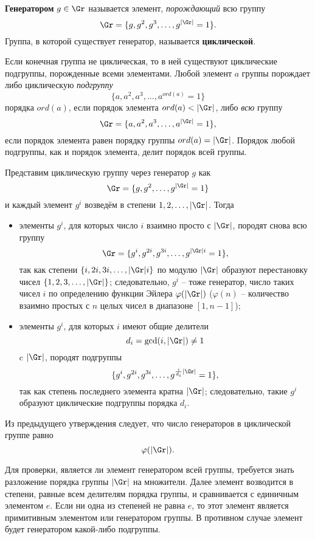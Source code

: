 \textbf{Генератором} $g \in \Gr$ называется элемент, \emph{порождающий} всю группу
    \[ \Gr = \{g, g^2, g^3,  \ldots,  g^{|\Gr|} = 1\}. \]
Группа, в которой существует генератор, называется \textbf{циклической}.

Если конечная группа не циклическая, то в ней существуют циклические подгруппы, порожденные всеми элементами. Любой элемент $a$ группы порождает либо циклическую \emph{подгруппу}
    \[ \{ a, a^2, a^3,  \dots,  a^{ord(a)} = 1 \} \]
порядка $ord(a)$, если порядок элемента $ord(a) < |\Gr|$, либо \emph{всю} группу
    \[ \Gr = \{ a, a^2, a^3,  \dots,  a^{|\Gr|} = 1 \}, \]
если порядок элемента равен порядку группы $ord(a) = |\Gr|$. Порядок любой подгруппы, как и порядок элемента, делит порядок всей группы.

Представим циклическую группу через генератор $g$ как
    \[ \Gr = \{g, g^2,  \ldots,  g^{|\Gr|} = 1\} \]
и каждый элемент $g^i$  возведём в степени $1, 2,  \ldots,  |\Gr|$. Тогда
\begin{itemize}
    \item элементы $g^i$, для которых число $i$ взаимно просто с $|\Gr|$, породят снова всю группу
            \[ \Gr = \{ g^i, g^{2i}, g^{3i},  \dots,  g^{|\Gr| i} = 1 \}, \]
        так как степени $\{i, 2i, 3i, \dots, |\Gr| i \}$ по модулю $|\Gr|$ образуют перестановку чисел $\{1, 2, 3, \dots, |\Gr|\}$; следовательно, $g^i$ -- тоже генератор, число таких чисел $i$ по определению функции Эйлера $\varphi(|\Gr|)$ ($\varphi(n)$ -- количество взаимно простых с $n$ целых чисел в диапазоне $[1,n-1]$);
    \item элементы $g^i$, для которых $i$ имеют общие делители
            \[ d_i = \gcd(i, |\Gr|) \neq 1 \]
        c $|\Gr|$, породят подгруппы
            \[ \{ g^i, g^{2i}, g^{3i},  \dots,  g^{\frac{i}{d_i} |\Gr|} = 1\}, \]
        так как степень последнего элемента кратна $|\Gr|$; следовательно, такие $g^i$ образуют циклические подгруппы порядка $d_i$.
\end{itemize}

Из предыдущего утверждения следует, что число генераторов в циклической группе равно
    \[ \varphi(|\Gr|). \]

Для проверки, является ли элемент генератором всей группы, требуется знать разложение порядка группы $|\Gr|$ на множители. Далее элемент возводится в степени, равные всем делителям порядка группы, и сравнивается с единичным элементом $e$. Если ни одна из степеней не равна $e$, то этот элемент является примитивным элементом или генератором группы. В противном случае элемент будет генератором какой-либо подгруппы.

